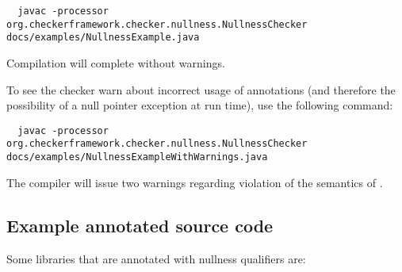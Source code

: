 \begin{smaller}
\begin{Verbatim}
  javac -processor org.checkerframework.checker.nullness.NullnessChecker docs/examples/NullnessExample.java
\end{Verbatim}
\end{smaller}

\noindent
Compilation will complete without warnings.

To see the checker warn about incorrect usage of annotations (and therefore the
possibility of a null pointer exception at run time), use the following command:

\begin{mysmall}
\begin{Verbatim}
  javac -processor org.checkerframework.checker.nullness.NullnessChecker docs/examples/NullnessExampleWithWarnings.java
\end{Verbatim}
\end{mysmall}


\noindent
The compiler will issue two warnings regarding violation of the semantics of
.


\subsection{Example annotated source code\label{nullness-annotated-library}}

Some libraries that are annotated with nullness qualifiers are:

